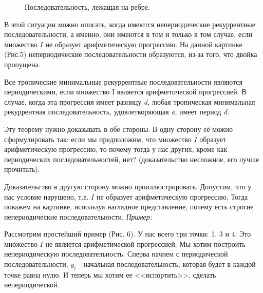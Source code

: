 \documentclass[russian]{lecture-notes}
\begin{document}
\begin{figure}[h!]
\caption{Последовательность, лежащая на ребре.}
\end{figure}

В этой ситуации можно описать, когда имеются непериодические рекуррентные
последовательности, а именно, они имеются в том и только в том случае, если множество $I$ не образует арифметическую прогрессию. На данной картинке (Рис.5) непериодические последовательности образуются, из-за того, что двойка пропущена.\\
\begin{Theorem}
	Все тропические минимальные рекуррентные последовательности являются периодическими, если множество I является арифметической прогрессией. В случае, когда эта прогрессия имеет разницу {\itshape d}, любая тропическая минимальная рекуррентная последовательность, удовлетворяющая {\itshape a}, имеет период {\itshape d}.
\end{Theorem}


Эту теорему нужно доказывать в обе стороны. В одну сторону её можно сформулировать так: если мы предположим, что множество $I$ образует арифметическую прогрессию, то почему тогда у нас других, кроме как периодических последовательностей, нет? (доказательство несложное, его лучше прочитать).

Доказательство в другую сторону можно проиллюстрировать. Допустим,
что у нас условие нарушено, т.е. $I$ не образует арифметическую прогрессию. Тогда покажем на картинке, используя наглядное представление, почему есть строгие непериодические последовательности.
 \emph{Пример:}

Рассмотрим простейший пример (Рис. 6). У нас всего три точки: 1, 3 и 4. Это множество $I$ не является арифметической прогрессией. Мы хотим построить непериодическую последовательность. Сперва начнем с периодической последовательности, $y_i$ - начальная последовательность, которая будет в каждой точке равна нулю. И теперь мы хотим ее <<испортить>>, сделать непериодической.
\end{document}
